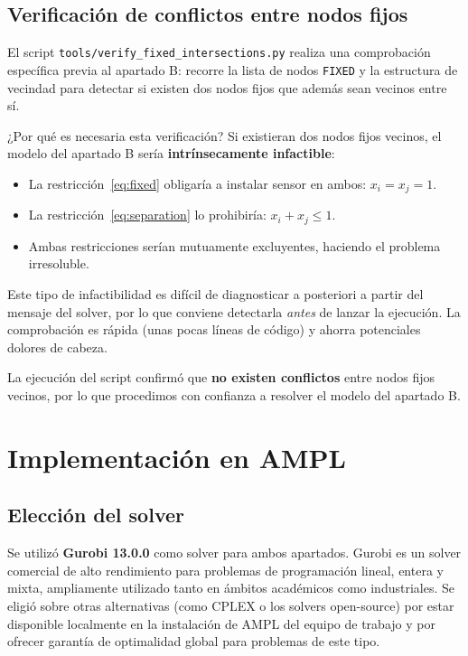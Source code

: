 \documentclass[12pt,a4paper]{article}
\begin{document}
\subsection{Verificación de conflictos entre nodos fijos}

El script \texttt{tools/verify\_fixed\_intersections.py} realiza una comprobación específica previa al apartado B: recorre la lista de nodos \texttt{FIXED} y la estructura de vecindad para detectar si existen dos nodos fijos que además sean vecinos entre sí.

¿Por qué es necesaria esta verificación? Si existieran dos nodos fijos vecinos, el modelo del apartado B sería \textbf{intrínsecamente infactible}:
\begin{itemize}
    \item La restricción~\eqref{eq:fixed} obligaría a instalar sensor en ambos: $x_i = x_j = 1$.
    \item La restricción~\eqref{eq:separation} lo prohibiría: $x_i + x_j \leq 1$.
    \item Ambas restricciones serían mutuamente excluyentes, haciendo el problema irresoluble.
\end{itemize}

Este tipo de infactibilidad es difícil de diagnosticar a posteriori a partir del mensaje del solver, por lo que conviene detectarla \emph{antes} de lanzar la ejecución. La comprobación es rápida (unas pocas líneas de código) y ahorra potenciales dolores de cabeza.

La ejecución del script confirmó que \textbf{no existen conflictos} entre nodos fijos vecinos, por lo que procedimos con confianza a resolver el modelo del apartado B.

\section{Implementación en AMPL}

\subsection{Elección del solver}

Se utilizó \textbf{Gurobi 13.0.0} como solver para ambos apartados. Gurobi es un solver comercial de alto rendimiento para problemas de programación lineal, entera y mixta, ampliamente utilizado tanto en ámbitos académicos como industriales. Se eligió sobre otras alternativas (como CPLEX o los solvers open-source) por estar disponible localmente en la instalación de AMPL del equipo de trabajo y por ofrecer garantía de optimalidad global para problemas de este tipo.
\end{document}
